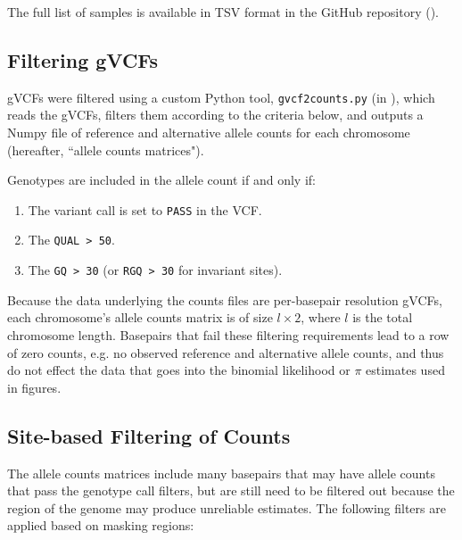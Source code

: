 \documentclass[11pt]{article}
\begin{document}
The full list of samples is available in TSV format in the GitHub repository
().

\subsection{Filtering gVCFs}

gVCFs were filtered using a custom Python tool, \texttt{gvcf2counts.py} (in
), which reads the gVCFs, filters them according to
the criteria below, and outputs a Numpy  file of reference and
alternative allele counts for each chromosome (hereafter, ``allele counts
matrices").

Genotypes are included in the allele count if and only if:

\begin{enumerate}
  \item The variant call is set to \texttt{PASS} in the VCF.
  \item The \texttt{QUAL > 50}.
  \item The \texttt{GQ > 30} (or \texttt{RGQ > 30} for invariant sites).
\end{enumerate}

Because the data underlying the counts files are per-basepair resolution gVCFs,
each chromosome's allele counts matrix is of size $l \times 2$, where $l$ is
the total chromosome length. Basepairs that fail these filtering requirements
lead to a row of zero counts, e.g. no observed reference and alternative allele
counts, and thus do not effect the data that goes into the binomial likelihood
or $\pi$ estimates used in figures.

\subsection{Site-based Filtering of Counts}

The allele counts matrices include many basepairs that may have allele counts
that pass the genotype call filters, but are still need to be filtered out
because the region of the genome may produce unreliable estimates. The
following filters are applied based on masking regions:
\end{document}
